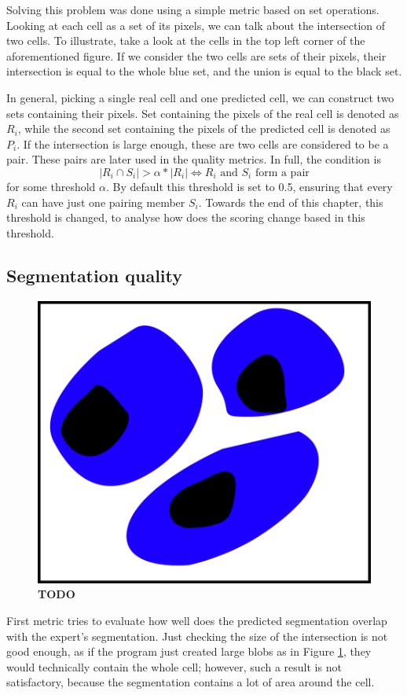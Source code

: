 \documentclass[
  digital,     %
  oneside,     %
  nosansbold,  %
  nocolorbold, %
  lof,         %
  lot,         %
]{fithesis4}
\begin{document}
Solving this problem was done using a simple metric based on set operations.
Looking at each cell as a set of its pixels, we can talk about the intersection
of two cells. To illustrate, take a look at the cells in the top left corner of
the aforementioned figure. If we consider the two cells are sets of their
pixels, their intersection is equal to the whole blue set, and the union is
equal to the black set.

In general, picking a single real cell and one predicted cell, we can construct
two sets containing their pixels. Set containing the pixels of the real cell is
denoted as $R_i$, while the second set containing the pixels of the predicted
cell is denoted as $P_i$. If the intersection is large enough, these are two
cells are considered to be a pair. These pairs are later used in the quality
metrics. In full, the condition is
$$|R_i \cap S_i| > \alpha * |R_i| \Leftrightarrow R_i \text{ and } S_i \text{ form a pair}$$
for some threshold $\alpha$. By default this threshold is set to 0.5, ensuring
that every $R_i$ can have just one pairing member $S_i$. Towards the end of this
chapter, this threshold is changed, to analyse how does the scoring change based
in this threshold.

\subsection{Segmentation quality}
\begin{figure}
    \begin{center}
        \includegraphics{resources/inkscape/evaluation_imprecise_segmentation.png}
    \end{center}
    \caption{\textbf{TODO}}
    \label{fig:evaluation_imprecise}
\end{figure}
First metric tries to evaluate how well does the predicted segmentation overlap
with the expert's segmentation. Just checking the size of the intersection is
not good enough, as if the program just created large blobs as in Figure
\ref{fig:evaluation_imprecise}, they would technically contain the whole cell;
however, such a result is not satisfactory, because the segmentation contains a
lot of area around the cell.
\end{document}
